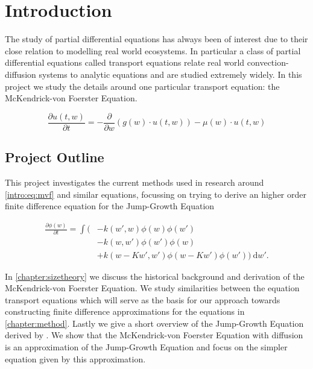\documentclass[../main]{subfiles}
\begin{document}

  \setlength{\parskip}{0em}
  \setcounter{page}{3}
  \tableofcontents
  \listoffigures

  \chapter{Introduction}\label{chapter:introduction}

  The study of partial differential equations has always been of interest due to their close relation to modelling real world ecosystems. In particular a class of partial differential equations called transport equations relate real world convection-diffusion systems to analytic equations and are studied extremely widely. In this project we study the details around one particular transport equation: the McKendrick-von Foerster Equation.

  \begin{equation} \label{intro:eq:mvf}
    \frac{\partial u(t, w)}{\partial t} = - \frac{\partial}{\partial w} \left(g(w) \cdot u(t, w) \right) - \mu(w) \cdot u(t, w)
  \end{equation}

  \section*{Project Outline}
  This project investigates the current methods used in research around \autoref{intro:eq:mvf} and similar equations, focussing on trying to derive an higher order finite difference equation for the Jump-Growth Equation

  \begin{align}\label{intro:eq:jumpgrowth}
    \frac{\partial \phi(w)}{\partial t}
    = \int ( &- k(w', w) \phi(w)\phi(w') \nonumber \\
    & - k(w, w')\phi(w')\phi(w) \nonumber \\
    & + k(w - Kw', w')\phi(w - Kw')\phi(w')) \: \mathrm{d}w'.
  \end{align}

  In \autoref{chapter:sizetheory} we discuss the historical background and derivation of the McKendrick-von Foerster Equation. We study similarities between the equation transport equations which will serve as the basis for our approach towards constructing finite difference approximations for the equations in \autoref{chapter:method}. Lastly we give a short overview of the Jump-Growth Equation derived by \cite{datta2010}. We show that the McKendrick-von Foerster Equation with diffusion is an approximation of the Jump-Growth Equation and focus on the simpler equation given by this approximation.
\end{document}
